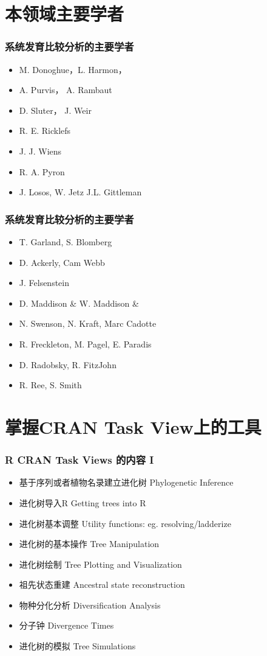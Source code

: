 \documentclass[UTF8]{beamer}
\begin{document}
\section{本领域主要学者}
\begin{frame}
\frametitle{系统发育比较分析的主要学者}
\begin{itemize}
\item M. Donoghue，L. Harmon，
\item A. Purvis， A. Rambaut 
\item D. Sluter， J. Weir
\item R. E. Ricklefs
\item J. J. Wiens
\item R. A. Pyron
\item J. Losos, W. Jetz   J.L. Gittleman
\end{itemize}
\end{frame}

\begin{frame}
\frametitle{系统发育比较分析的主要学者}
\begin{itemize}
\item T. Garland, S. Blomberg
\item D. Ackerly, Cam Webb
\item J. Felsenstein
\item D. Maddison \& W. Maddison \& 
\item N. Swenson, N. Kraft, Marc Cadotte
\item R. Freckleton, M. Pagel, E. Paradis 
\item D. Radobsky, R. FitzJohn
\item R. Ree, S. Smith
\end{itemize}
\end{frame}

\section{掌握CRAN Task View上的工具}
\begin{frame}
\frametitle{R CRAN Task Views 的内容 I }

\begin{itemize}
\item 基于序列或者植物名录建立进化树 Phylogenetic Inference 
\item 进化树导入R Getting trees into R
\item 进化树基本调整 Utility functions: eg. resolving/ladderize
\item 进化树的基本操作 Tree Manipulation
\item 进化树绘制 Tree Plotting and Visualization
\item 祖先状态重建 Ancestral state reconstruction
\item 物种分化分析 Diversification Analysis
\item 分子钟 Divergence Times
\item 进化树的模拟 Tree Simulations
\end{itemize}  
\end{frame}
\end{document}
